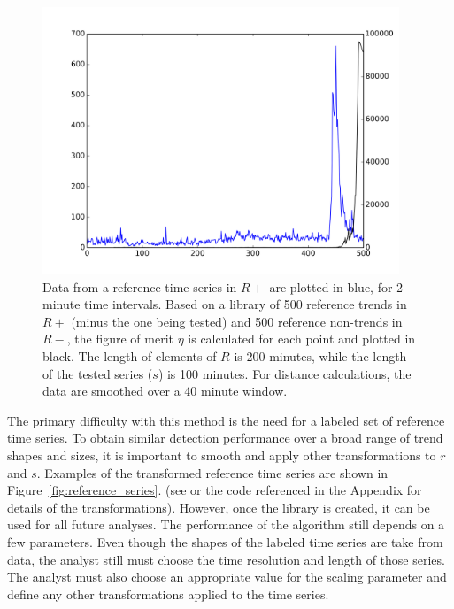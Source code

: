 \documentclass{article}
\begin{document}
\begin{figure}
\begin{center}
\includegraphics[width=0.95\textwidth]{fig/nikolov.png} 
\caption{Data from a reference time series in $R+$ are plotted in blue, for
2-minute time intervals. Based on a library of 500 reference trends in $R+$
(minus the one being tested) and 500 reference non-trends in $R-$, the figure of
merit $\eta$ is calculated for each point and plotted in black. The length of
elements of $R$ is 200 minutes, while the length of the tested series ($s$) is 100
minutes. For distance calculations, the data are smoothed over a 40 minute 
window.}
\label{fig:nikolov_eta} 
\end{center}
\end{figure}

The primary difficulty with this method is the need for a labeled set of reference time
series. To obtain similar detection performance over a broad range of trend shapes and sizes, 
it is important to smooth and apply other transformations to $r$ and $s$.
Examples of the transformed reference time series are shown in Figure~\ref{fig:reference_series}.
(see \cite{Nikolov:2011} or the code referenced in the Appendix
for details of the transformations). 
However, once the library is created, it can be used
for all future analyses. The performance of the algorithm still depends on a
few parameters. Even though the shapes of the labeled time series are take from
data, the analyst still must choose the time resolution and length of those
series. The analyst must also choose an appropriate value for the scaling
parameter and define any other transformations applied to the time series. 
\end{document}
